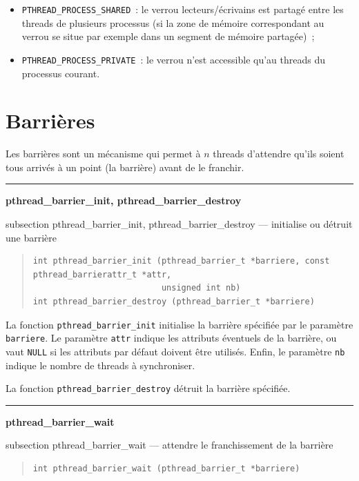 \documentclass [twoside] {report}
\newcommand {\primitive} [1]
    {
	\phantomsection
	{\large \textbf {#1}}
	\addcontentsline {toc} {subsection} {#1}
    }
\newcommand {\separation}
    {
	\vspace {5mm}
	\nopagebreak
	\hrule
    }
\begin{document}
\begin {itemize}
    \item \verb|PTHREAD_PROCESS_SHARED|~: le verrou lecteurs/écrivains
	est partagé entre les threads de plusieurs processus (si la zone
	de mémoire correspondant au verrou se situe par exemple dans un
	segment de mémoire partagée)~;
    \item \verb|PTHREAD_PROCESS_PRIVATE|~: le verrou n'est accessible
	qu'au threads du processus courant.
\end {itemize}


\section {Barrières}

Les barrières sont un mécanisme qui permet à $n$ threads d'attendre
qu'ils soient tous arrivés à un point (la barrière) avant de le
franchir.

\separation
\primitive {pthread\_barrier\_init, pthread\_barrier\_destroy} --- initialise ou détruit une barrière

\begin {quote}
\begin {verbatim}
int pthread_barrier_init (pthread_barrier_t *barriere, const pthread_barrierattr_t *attr,
                          unsigned int nb)
int pthread_barrier_destroy (pthread_barrier_t *barriere)
\end{verbatim}
\end {quote}

La fonction \verb|pthread_barrier_init| initialise la barrière
spécifiée par le paramètre \texttt {barriere}.  Le paramètre \texttt
{attr} indique les attributs éventuels de la barrière, ou vaut \texttt
{NULL} si les attributs par défaut doivent être utilisés. Enfin,
le paramètre \texttt {nb} indique le nombre de threads à synchroniser.

La fonction \verb|pthread_barrier_destroy| détruit la barrière spécifiée.


\separation
\primitive {pthread\_barrier\_wait} --- attendre le franchissement de la barrière

\begin {quote}
\begin {verbatim}
int pthread_barrier_wait (pthread_barrier_t *barriere)
\end{verbatim}
\end {quote}
\end{document}
